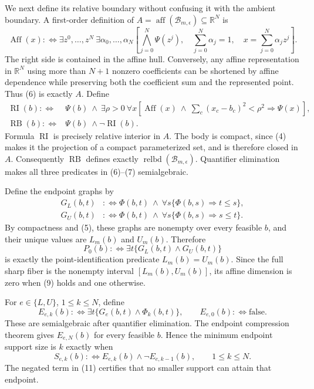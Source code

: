 We next define its relative boundary without confusing it with the ambient boundary.  A first-order definition of \(A=\operatorname{aff}(\mathcal B_{m,\epsilon})\subseteq\mathbb R^N\) is
\[
 \operatorname{Aff}(x):\Longleftrightarrow
 \exists z^0,\ldots,z^N\ \exists\alpha_0,\ldots,\alpha_N
 \left[
 \bigwedge_{j=0}^N\Psi(z^j),\quad
 \sum_{j=0}^N\alpha_j=1,\quad
 x=\sum_{j=0}^N\alpha_jz^j
 \right].
\tag{6}
\]
The right side is contained in the affine hull.  Conversely, any affine representation in \(\mathbb R^N\) using more than \(N+1\) nonzero coefficients can be shortened by affine dependence while preserving both the coefficient sum and the represented point.  Thus (6) is exactly \(A\).  Define
\[
 \begin{split}
 \operatorname{RI}(b):\Longleftrightarrow{}&\Psi(b)\ \wedge\
 \exists\rho>0\ \forall x\left[
 \operatorname{Aff}(x)\ \wedge\ \sum_c(x_c-b_c)^2<\rho^2
 \Rightarrow\Psi(x)
 \right],\\
 \operatorname{RB}(b):\Longleftrightarrow{}&\Psi(b)\ \wedge\neg\operatorname{RI}(b).
 \end{split}
\tag{7}
\]
Formula \(\operatorname{RI}\) is precisely relative interior in \(A\).  The body is compact, since (4) makes it the projection of a compact parameterized set, and is therefore closed in \(A\).  Consequently \(\operatorname{RB}\) defines exactly \(\operatorname{relbd}(\mathcal B_{m,\epsilon})\).  Quantifier elimination makes all three predicates in (6)--(7) semialgebraic.

Define the endpoint graphs by
\[
 \begin{split}
 G_L(b,t)&:\Longleftrightarrow
 \Phi(b,t)\ \wedge\ \forall s\{\Phi(b,s)\Rightarrow t\leq s\},\\
 G_U(b,t)&:\Longleftrightarrow
 \Phi(b,t)\ \wedge\ \forall s\{\Phi(b,s)\Rightarrow s\leq t\}.
 \end{split}
\tag{8}
\]
By compactness and (5), these graphs are nonempty over every feasible \(b\), and their unique values are \(L_m(b)\) and \(U_m(b)\).  Therefore
\[
 P_0(b):\Longleftrightarrow\exists t\{G_L(b,t)\wedge G_U(b,t)\}
\tag{9}
\]
is exactly the point-identification predicate \(L_m(b)=U_m(b)\).  Since the full sharp fiber is the nonempty interval \([L_m(b),U_m(b)]\), its affine dimension is zero when (9) holds and one otherwise.

For \(e\in\{L,U\}\), \(1\leq k\leq N\), define
\[
 E_{e,k}(b):\Longleftrightarrow
 \exists t\{G_e(b,t)\wedge\Phi_k(b,t)\},
 \qquad E_{e,0}(b):\Longleftrightarrow\mathrm{false}.
\tag{10}
\]
These are semialgebraic after quantifier elimination.  The endpoint compression theorem gives \(E_{e,N}(b)\) for every feasible \(b\).  Hence the minimum endpoint support size is \(k\) exactly when
\[
 S_{e,k}(b):\Longleftrightarrow
 E_{e,k}(b)\wedge\neg E_{e,k-1}(b),
 \qquad 1\leq k\leq N.
\tag{11}
\]
The negated term in (11) certifies that no smaller support can attain that endpoint.

